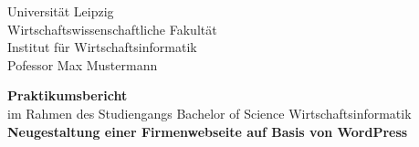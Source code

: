 
\newcommand{\trtitleone}{Neugestaltung einer Firmenwebseite auf Basis von WordPress}
\newcommand{\trtitletwo}{}
\newcommand{\trtype}{Bachelorarbeit zur Erlangung des akademischen Grades}
\newcommand{\trabschluss}{Bachelor of Science}
\newcommand{\trauthor}{Li, Ye}
\newcommand{\trstrasse}{Hauptstraße 1}
\newcommand{\trmatrikelnummer}{123456}
\newcommand{\trplz}{04109}
\newcommand{\trort}{Leipzig}
\newcommand{\tremail}{maxmustermann@email.de}
\newcommand{\trtelefon}{012345 67890}
\newcommand{\truni}{Universität Leipzig}
\newcommand{\trfakultaet}{Wirtschaftswissenschaftliche Fakultät}
\newcommand{\trfachbereich}{Institut für Wirtschaftsinformatik}
\newcommand{\trstudiengang}{Wirtschaftsinformatik}
\newcommand{\trprofessor}{Pofessor Max Mustermann}

\newcommand{\trdate}{\today}

\thispagestyle{empty}

\begin{center}
\truni\\
\trfakultaet\\
\trfachbereich\\
\trprofessor
\end{center}

\vspace{1.5cm}

\begin{center}
	\textbf{Praktikumsbericht}\\
	im Rahmen des Studiengangs Bachelor of Science Wirtschaftsinformatik\\[1cm]
	\textbf{\large \trtitleone}\\[0.1cm]
	\textbf{\large \trtitletwo}
\end{center}

\vspace{2.7cm}

